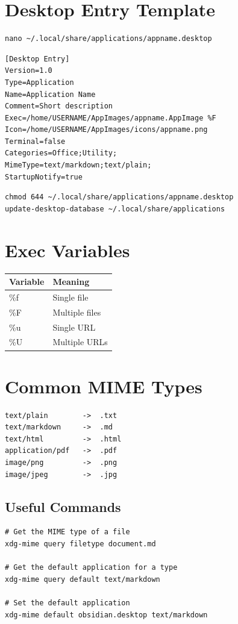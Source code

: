 \documentclass[12pt, a4paper]{book}
\begin{document}
\section{Desktop Entry Template}
\begin{lstlisting}
nano ~/.local/share/applications/appname.desktop
\end{lstlisting}

\begin{lstlisting}
[Desktop Entry]
Version=1.0
Type=Application
Name=Application Name
Comment=Short description
Exec=/home/USERNAME/AppImages/appname.AppImage %F
Icon=/home/USERNAME/AppImages/icons/appname.png
Terminal=false
Categories=Office;Utility;
MimeType=text/markdown;text/plain;
StartupNotify=true
\end{lstlisting}

\begin{lstlisting}
chmod 644 ~/.local/share/applications/appname.desktop
update-desktop-database ~/.local/share/applications
\end{lstlisting}

\section{Exec Variables}

\begin{center}
\begin{tabularx}{0.7\textwidth}{lL}
\toprule
\textbf{Variable} & \textbf{Meaning} \\
\midrule
\%f & Single file \\
\%F & Multiple files \\
\%u & Single URL \\
\%U & Multiple URLs \\
\bottomrule
\end{tabularx}
\end{center}

\section{Common MIME Types}
\begin{lstlisting}
text/plain        ->  .txt
text/markdown     ->  .md
text/html         ->  .html
application/pdf   ->  .pdf
image/png         ->  .png
image/jpeg        ->  .jpg
\end{lstlisting}

\subsection{Useful Commands}
\begin{lstlisting}
# Get the MIME type of a file
xdg-mime query filetype document.md

# Get the default application for a type
xdg-mime query default text/markdown

# Set the default application
xdg-mime default obsidian.desktop text/markdown
\end{lstlisting}
\end{document}
